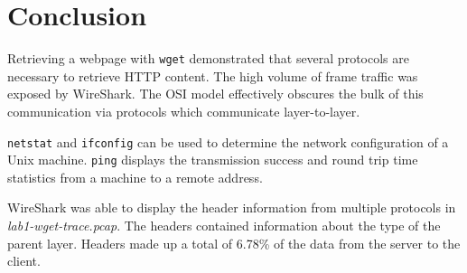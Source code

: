 \section{Conclusion}\label{sec:conclusion}
Retrieving a webpage with \texttt{wget} demonstrated that several protocols are necessary to retrieve HTTP content.
The high volume of frame traffic was exposed by WireShark.
The OSI model effectively obscures the bulk of this communication via protocols which communicate layer-to-layer.

\texttt{netstat} and \texttt{ifconfig} can be used to determine the network configuration of a Unix machine.
\texttt{ping} displays the transmission success and round trip time statistics from a machine to a remote address.

WireShark was able to display the header information from multiple protocols in \textit{lab1-wget-trace.pcap}.
The headers contained information about the type of the parent layer.
Headers made up a total of 6.78\% of the data from the server to the client.
